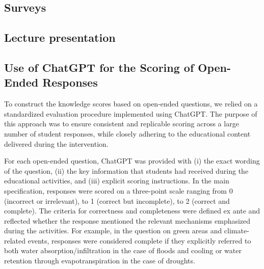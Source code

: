 \documentclass[preprint,12pt]{elsarticle}
\begin{document}
\clearpage

\subsection{Surveys}
\label{survey}






\clearpage

\subsection{Lecture presentation}

\clearpage

\subsection{Use of ChatGPT for the Scoring of Open-Ended Responses}
\label{chat}
To construct the knowledge scores based on open-ended questions, we relied on a standardized evaluation procedure implemented using ChatGPT. The purpose of this approach was to ensure consistent and replicable scoring across a large number of student responses, while closely adhering to the educational content delivered during the intervention.

For each open-ended question, ChatGPT was provided with (i) the exact wording of the question, (ii) the key information that students had received during the educational activities, and (iii) explicit scoring instructions. In the main specification, responses were scored on a three-point scale ranging from 0 (incorrect or irrelevant), to 1 (correct but incomplete), to 2 (correct and complete). The criteria for correctness and completeness were defined ex ante and reflected whether the response mentioned the relevant mechanisms emphasized during the activities. For example, in the question on green areas and climate-related events, responses were considered complete if they explicitly referred to both water absorption/infiltration in the case of floods and cooling or water retention through evapotranspiration in the case of droughts.
\end{document}
